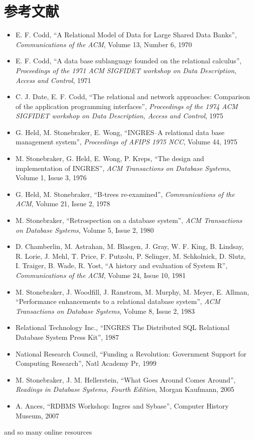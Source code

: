 \section*{参考文献}


\small


\begin{itemize}
 \item E. F. Codd, ``A Relational Model of Data for Large Shared Data
       Banks'', {\it Communications of the ACM}, Volume 13, Number 6,
       1970
 \item E. F. Codd, ``A data base sublanguage founded on the relational
       calculus'', {\it Proceedings of the 1971 ACM SIGFIDET workshop
       on Data Description, Access and Control}, 1971
 \item C. J. Date, E. F. Codd, ``The relational and network approaches: Comparison of the
       application programming interfaces'', {\it Proceedings of the
       1974 ACM SIGFIDET workshop on Data Description, Access and
       Control}, 1975
 \item G. Held, M. Stonebraker, E. Wong, ``INGRES--A relational data
       base management system'', {\it Proceedings of AFIPS 1975 NCC},
       Volume 44, 1975
 \item M. Stonebraker, G. Held, E. Wong, P. Kreps, ``The design and
       implementation of INGRES'', {\it ACM Transactions on Database
       Systems}, Volume 1, Issue 3, 1976
 \item G. Held, M. Stonebraker, ``B-trees re-examined'', {\it Communications of the
       ACM}, Volume 21, Issue 2, 1978
 \item M. Stonebraker, ``Retrospection on a database system'', {\it ACM
       Transactions on Database Systems}, Volume 5, Issue 2, 1980
 \item D. Chamberlin, M. Astrahan, M. Blasgen, J. Gray, W. F. King,
       B. Lindsay, R. Lorie, J. Mehl, T. Price, F. Putzolu, P. Selinger,
       M. Schkolnick, D. Slutz, I. Traiger, B. Wade, R. Yost, ``A
       history and evaluation of System R'', {\it Communications of the
       ACM}, Volume 24, Issue 10, 1981
 \item M. Stonebraker, J. Woodfill, J. Ranstrom, M. Murphy, M. Meyer,
       E. Allman, ``Performance enhancements to a relational database
       system'', {\it ACM Transactions on Database Systems}, Volume 8,
       Issue 2, 1983
 \item Relational Technology Inc., ``INGRES The Distributed SQL
       Relational Database System Press Kit'', 1987
 \item National Research Council, ``Funding a Revolution: Government
       Support for Computing Research'', Natl Academy Pr, 1999
 \item M. Stonebraker, J. M. Hellerstein, ``What Goes Around Comes
       Around'', {\it Readings in Database Systems, Fourth Edition},
       Morgan Kaufmann, 2005
 \item A. Ances, ``RDBMS Workshop: Ingres and Sybase'', Computer
       History Museum, 2007
\end{itemize}


and so many online resources


\normalsize